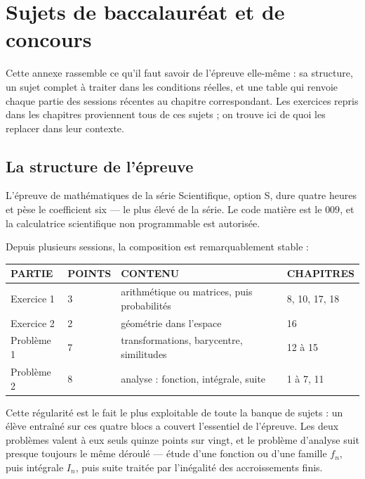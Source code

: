 \chapter{Sujets de baccalauréat et de concours}

Cette annexe rassemble ce qu'il faut savoir de l'épreuve elle-même : sa
structure, un sujet complet à traiter dans les conditions réelles, et une
table qui renvoie chaque partie des sessions récentes au chapitre
correspondant. Les exercices repris dans les chapitres proviennent tous de ces
sujets ; on trouve ici de quoi les replacer dans leur contexte.

\section*{La structure de l'épreuve}

L'épreuve de mathématiques de la série Scientifique, option S, dure quatre
heures et pèse le coefficient six — le plus élevé de la série. Le code matière
est le $009$, et la calculatrice scientifique non programmable est autorisée.

Depuis plusieurs sessions, la composition est remarquablement stable :

\begin{center}
\setlength{\tabcolsep}{6pt}
\renewcommand{\arraystretch}{1.35}
\begin{tabular}{@{}L{1.7cm}L{1.3cm}L{5.9cm}L{2.4cm}@{}}
\toprule
\textsf{\footnotesize\bfseries PARTIE} &
\textsf{\footnotesize\bfseries POINTS} &
\textsf{\footnotesize\bfseries CONTENU} &
\textsf{\footnotesize\bfseries CHAPITRES} \\
\midrule
Exercice 1 & 3 & arithmétique ou matrices, puis probabilités & 8, 10, 17, 18 \\
Exercice 2 & 2 & géométrie dans l'espace & 16 \\
Problème 1 & 7 & transformations, barycentre, similitudes & 12 à 15 \\
Problème 2 & 8 & analyse : fonction, intégrale, suite & 1 à 7, 11 \\
\bottomrule
\end{tabular}
\end{center}

\noindent
Cette régularité est le fait le plus exploitable de toute la banque de
sujets : un élève entraîné sur ces quatre blocs a couvert l'essentiel de
l'épreuve. Les deux problèmes valent à eux seuls quinze points sur vingt, et
le problème d'analyse suit presque toujours le même déroulé — étude d'une
fonction ou d'une famille $f_{n}$, puis intégrale $I_{n}$, puis suite traitée
par l'inégalité des accroissements finis.

